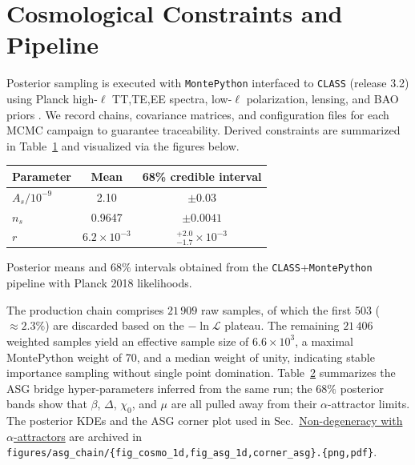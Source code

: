 \documentclass[
]{article}
\newcounter{none} %
\begin{document}
\section{Cosmological Constraints and
Pipeline}\label{cosmological-constraints-and-pipeline}

Posterior sampling is executed with \texttt{MontePython} interfaced to
\texttt{CLASS} (release 3.2) using Planck high-\(\ell\) TT,TE,EE
spectra, low-\(\ell\) polarization, lensing, and BAO priors . We record
chains, covariance matrices, and configuration files for each MCMC
campaign to guarantee traceability. Derived constraints are summarized
in Table~\hyperref[tab:constraints]{1} and visualized via the figures
below.

{\def\LTcaptype{none} %
\begin{longtable}[]{@{}lcc@{}}
\toprule\noalign{}
Parameter & Mean & 68\% credible interval \\
\midrule\noalign{}
\endhead
\bottomrule\noalign{}
\endlastfoot
\(A_{s}/10^{- 9}\) & 2.10 & \(\pm 0.03\) \\
\(n_{s}\) & 0.9647 & \(\pm 0.0041\) \\
\(r\) & \(6.2 \times 10^{- 3}\) &
\(_{- 1.7}^{+ 2.0} \times 10^{- 3}\) \\
\end{longtable}
}

Posterior means and \(68\%\) intervals obtained from the
\texttt{CLASS}+\texttt{MontePython} pipeline with Planck 2018
likelihoods.

The production chain comprises \(21\,909\) raw samples, of which the
first 503 (\(\approx 2.3\%\)) are discarded based on the
\(-\ln\mathcal{L}\) plateau. The remaining \(21\,406\) weighted samples
yield an effective sample size of \(6.6 \times 10^{3}\), a maximal
MontePython weight of 70, and a median weight of unity, indicating
stable importance sampling without single point domination.
Table~\hyperref[tab:asg-hyper]{2} summarizes the ASG bridge
hyper-parameters inferred from the same run; the \(68\%\) posterior
bands show that \(\beta\), \(\Delta\), \(\chi_{0}\), and \(\mu\) are all
pulled away from their \(\alpha\)-attractor limits. The posterior KDEs
and the ASG corner plot used in
Sec.~\hyperref[non-degeneracy-with-alpha-attractors]{Non-degeneracy with
\(\alpha\)-attractors} are archived in
\texttt{figures/asg\_chain/\{fig\_cosmo\_1d,fig\_asg\_1d,corner\_asg\}.\{png,pdf\}}.
\end{document}
